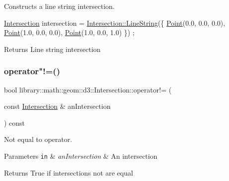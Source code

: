 Constructs a line string intersection. 


\begin{DoxyCode}
\hyperlink{classlibrary_1_1math_1_1geom_1_1d3_1_1_intersection_afbaef540a058ccc7e58f1be2585304a9}{Intersection} intersection = \hyperlink{classlibrary_1_1math_1_1geom_1_1d3_1_1_intersection_aa546d0185512a4c093a705a4c96f8960}{Intersection::LineString}(\{ 
      \hyperlink{classlibrary_1_1math_1_1geom_1_1d3_1_1_intersection_a5155cc245bd2bf96a4296b0a8319c709}{Point}(0.0, 0.0, 0.0), \hyperlink{classlibrary_1_1math_1_1geom_1_1d3_1_1_intersection_a5155cc245bd2bf96a4296b0a8319c709}{Point}(1.0, 0.0, 0.0), \hyperlink{classlibrary_1_1math_1_1geom_1_1d3_1_1_intersection_a5155cc245bd2bf96a4296b0a8319c709}{Point}(1.0, 0.0, 1.0) \}) ;
\end{DoxyCode}


\begin{DoxyReturn}{Returns}
Line string intersection 
\end{DoxyReturn}
\mbox{\label{classlibrary_1_1math_1_1geom_1_1d3_1_1_intersection_a8e3e47ed63f5c539cc39625b512c4b9e}} 
\subsubsection{\texorpdfstring{operator"!=()}{operator!=()}}
{\footnotesize\ttfamily bool library\+::math\+::geom\+::d3\+::\+Intersection\+::operator!= (\begin{DoxyParamCaption}\item[{const \hyperlink{classlibrary_1_1math_1_1geom_1_1d3_1_1_intersection}{Intersection} \&}]{an\+Intersection }\end{DoxyParamCaption}) const}



Not equal to operator. 


\begin{DoxyParams}[1]{Parameters}
\mbox{\tt in}  & {\em an\+Intersection} & An intersection \\
\hline
\end{DoxyParams}
\begin{DoxyReturn}{Returns}
True if intersections not are equal 
\end{DoxyReturn}
\mbox{\label{classlibrary_1_1math_1_1geom_1_1d3_1_1_intersection_a2b71d1b2a6429a893a8737a4d02c2da6}} 
